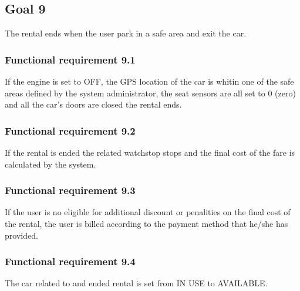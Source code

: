\subsection{Goal 9}
The rental ends when the user park in a safe area and exit the car.

\setcounter{secnumdepth}{3}
\subsubsection{Functional requirement 9.1}
If the engine is set to OFF, the GPS location of the car is whitin one of the safe areas defined by the system administrator, the seat sensors are all set to 0 (zero) and all the car's doors are closed the rental ends.

\subsubsection{Functional requirement 9.2}
If the rental is ended the related watchstop stops and the final cost of the fare is calculated by the system.

\subsubsection{Functional requirement 9.3}
If the user is no eligible for additional discount or penalities on the final cost of the rental, the user is billed according to the payment method that he/she has provided.

\subsubsection{Functional requirement 9.4}
The car related to and ended rental is set from IN USE to AVAILABLE.
